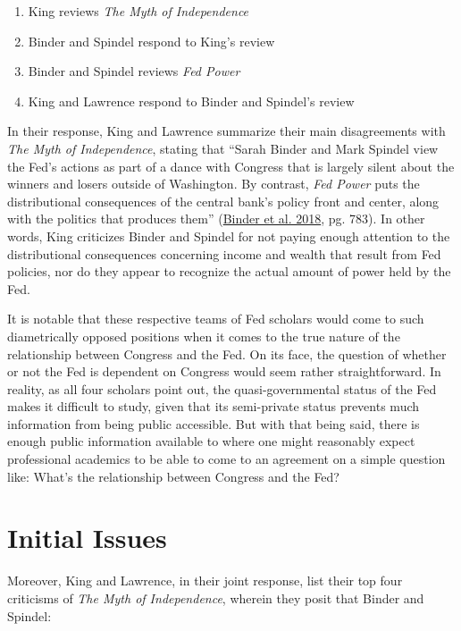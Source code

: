 \documentclass[
  11pt,
]{article}
\providecommand{\tightlist}{%
  \setlength{\itemsep}{0pt}\setlength{\parskip}{0pt}}
\begin{document}
\begin{enumerate}
\def\labelenumi{\arabic{enumi}.}
\tightlist
\item
  King reviews \emph{The Myth of Independence}
\item
  Binder and Spindel respond to King's review
\item
  Binder and Spindel reviews \emph{Fed Power}
\item
  King and Lawrence respond to Binder and Spindel's review
\end{enumerate}

In their response, King and Lawrence summarize their main disagreements
with \emph{The Myth of Independence}, stating that ``Sarah Binder and
Mark Spindel view the Fed's actions as part of a dance with Congress
that is largely silent about the winners and losers outside of
Washington. By contrast, \emph{Fed Power} puts the distributional
consequences of the central bank's policy front and center, along with
the politics that produces them''
(\protect\hyperlink{ref-binder2018c}{Binder et al. 2018}, pg. 783). In
other words, King criticizes Binder and Spindel for not paying enough
attention to the distributional consequences concerning income and
wealth that result from Fed policies, nor do they appear to recognize
the actual amount of power held by the Fed.

It is notable that these respective teams of Fed scholars would come to
such diametrically opposed positions when it comes to the true nature of
the relationship between Congress and the Fed. On its face, the question
of whether or not the Fed is dependent on Congress would seem rather
straightforward. In reality, as all four scholars point out, the
quasi-governmental status of the Fed makes it difficult to study, given
that its semi-private status prevents much information from being public
accessible. But with that being said, there is enough public information
available to where one might reasonably expect professional academics to
be able to come to an agreement on a simple question like: What's the
relationship between Congress and the Fed?

\hypertarget{initial-issues}{%
\section{Initial Issues}\label{initial-issues}}

Moreover, King and Lawrence, in their joint response, list their top
four criticisms of \emph{The Myth of Independence}, wherein they posit
that Binder and Spindel:
\end{document}
